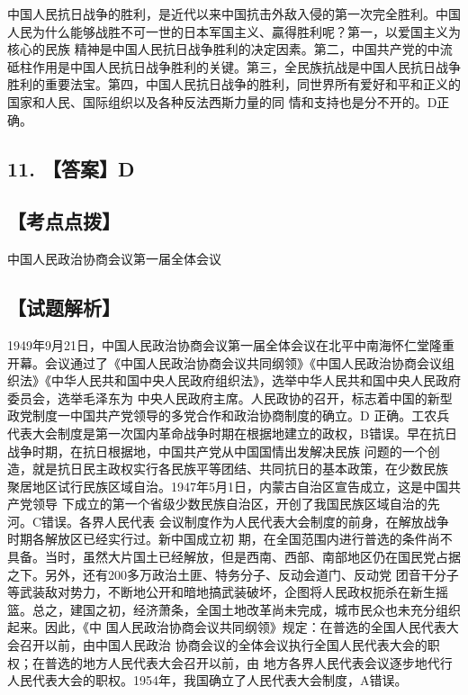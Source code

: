\documentclass[UTF8,11pt]{ctexart}
\begin{document}
中国人民抗日战争的胜利，是近代以来中国抗击外敌入侵的第一次完全胜利。中国人民为什么能够战胜不可一世的日本军国主义、贏得胜利呢？第一，以爱国主义为核心的民族 精神是中国人民抗日战争胜利的决定因素。第二，中国共产党的中流砥柱作用是中国人民抗日战争胜利的关键。第三，全民族抗战是中国人民抗日战争胜利的重要法宝。第四，中国人民抗日战争的胜利，同世界所有爱好和平和正义的国家和人民、国际组织以及各种反法西斯力量的同 情和支持也是分不开的。D正确。


\subsection*{11. 【答案】D}

\subsection*{【考点点拨】}

中国人民政治协商会议第一届全体会议


\subsection*{【试题解析】}

1949年9月21日，中国人民政治协商会议第一届全体会议在北平中南海怀仁堂隆重开幕。会议通过了《中国人民政治协商会议共同纲领》《中国人民政治协商会议组织法》《中华人民共和国中央人民政府组织法》，选举中华人民共和国中央人民政府委员会，选举毛泽东为 中央人民政府主席。人民政协的召开，标志着中国的新型政党制度一中国共产党领导的多党合作和政治协商制度的确立。D 正确。工农兵代表大会制度是第一次国内革命战争时期在根据地建立的政权，B错误。早在抗日战争时期，在抗日根据地，中国共产党从中国国情出发解决民族 问题的一个创造，就是抗日民主政权实行各民族平等团结、共同抗日的基本政策，在少数民族 聚居地区试行民族区域自治。1947年5月1日，内蒙古自治区宣告成立，这是中国共产党领导 下成立的第一个省级少数民族自治区，开创了我国民族区域自治的先河。C错误。各界人民代表 会议制度作为人民代表大会制度的前身，在解放战争时期各解放区已经实行过。新中国成立初 期，在全国范围内进行普选的条件尚不具备。当时，虽然大片国土已经解放，但是西南、西部、南部地区仍在国民党占据之下。另外，还有200多万政治土匪、特务分子、反动会道门、反动党 团音干分子等武装敌对势力，不断地公开和暗地搞武装破坏，企图将人民政权扼杀在新生摇篮。总之，建国之初，经济萧条，全国土地改革尚未完成，城市民众也未充分组织起来。因此，《中 国人民政治协商会议共同纲领》规定：在普选的全国人民代表大会召开以前，由中国人民政治 协商会议的全体会议执行全国人民代表大会的职权；在普选的地方人民代表大会召开以前，由 地方各界人民代表会议逐步地代行人民代表大会的职权。1954年，我国确立了人民代表大会制度，A错误。
\end{document}
